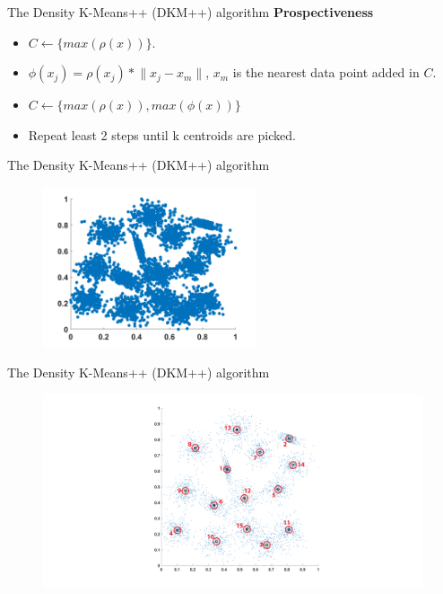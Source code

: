 \documentclass{beamer}
\newlength{\tmpShadow}
\newcommand{\MyShadow}[2]{%
	\settowidth{\tmpShadow}{#1}
	\addtolength{\tmpShadow}{.1em}
	\raisebox{-0.25ex}{\textcolor{gray!70}{#1}}%
	\kern-\tmpShadow%
	\textcolor{#2}{#1}%
}
\begin{document}
{\begin{frame}{The Density K-Means++ (DKM++) algorithm}
	\textbf{Prospectiveness}\\
	\vspace{15mm}
	\begin{itemize}[label={\MyShadow{$\bullet$}{blue!80}}]
		\item $C \longleftarrow \{max(\rho(x))\}$.
		\vspace{3mm}
		\item $\phi(x_j) = \rho(x_j) * \lVert x_j - x_m \rVert$, $x_m$ is the nearest data point added in $C$.
		\vspace{3mm}
		\item $C \longleftarrow \{max(\rho(x)),max(\phi(x))\}$
		\vspace{3mm}
		\item Repeat least 2 steps until k centroids are picked.
	\end{itemize}
	\vspace{40mm}
\end{frame}

\begin{frame}{The Density K-Means++ (DKM++) algorithm}
	\begin{figure}[H]
		\centering
		\includegraphics[width=0.56\textwidth]{figures/dataset}
	\end{figure}
\end{frame}
\begin{frame}{The Density K-Means++ (DKM++) algorithm}
	\begin{figure}[H]
		\centering
		\includegraphics[width=\textwidth]{figures/dkmpp2a}
	\end{figure}
\end{frame}

}
\end{document}
